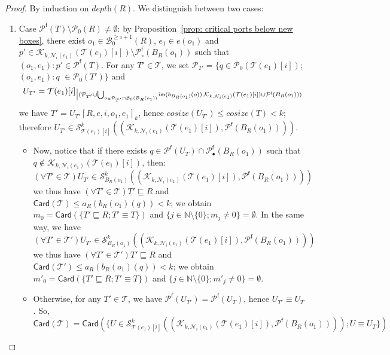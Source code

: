\documentclass{article}
\theoremstyle{plain}
\newcommand{\Nat}{\ensuremath{\mathbb{N}}}
\newcommand{\nontrivialconnected}[3]{\mathcal{S}_{#1}^{#3}(#2)}
\newcommand{\taylor}[2]{\mathcal{T}(#1)[#2]}
\newcommand{\criticalports}[3]{\mathcal{K}_{#2, #3}(#1)}
\newcommand{\cosize}[1]{\textit{cosize}(#1)}
\newcommand{\depthof}[1]{\textit{depth}(#1)}
\def\restriction#1#2{\mathchoice
              {\setbox1\hbox{${\displaystyle #1}_{\scriptstyle #2}$}
              \restrictionaux{#1}{#2}}
              {\setbox1\hbox{${\textstyle #1}_{\scriptstyle #2}$}
              \restrictionaux{#1}{#2}}
              {\setbox1\hbox{${\scriptstyle #1}_{\scriptscriptstyle #2}$}
              \restrictionaux{#1}{#2}}
              {\setbox1\hbox{${\scriptscriptstyle #1}_{\scriptscriptstyle #2}$}
              \restrictionaux{#1}{#2}}}
\def\restrictionaux#1#2{{#1\,\smash{\vrule height .8\ht1 depth .85\dp1}}_{\,#2}}
\newcommand{\im}[1]{\textsf{im}(#1)}
\newcommand{\portsatzero}[1]{\mathcal{P}_0(#1)}
\newcommand{\arity}[1]{{\textit{a}}_{#1}}
\newcommand{\conclusions}[1]{\mathcal{P}^{\textsf{f}}(#1)}
\newcommand{\Card}[1]{\textsf{Card}\left( #1 \right)}
\newcommand{\conclusionscirc}[1]{\mathcal{P}_\circ^{\textsf{f}}(#1)}
\newcommand{\conclusionsnotcirc}[1]{\mathcal{P}_\bullet^{\textsf{f}}(#1)}
\newcommand{\boxesatzero}[1]{\mathcal{B}_{0}(#1)}
\newcommand{\boxesatzerogeq}[2]{\mathcal{B}_0^{\geq #2}(#1)}
\begin{document}
\begin{proof}
By induction on $\depthof{R}$. We distinguish between two cases:
\begin{enumerate}
\item Case $\conclusions{T} \setminus \portsatzero{R} \not= \emptyset$: by Proposition~\ref{prop: critical ports below new boxes}, there exist $o_1 \in \boxesatzerogeq{R}{i+1}$, $e_1 \in e(o_1)$ and $p' \in \criticalports{\taylor{e_1}{i}}{k}{\mathcal{N}_i(e_1)} \setminus \conclusionscirc{B_R(o_1)}$ such that $(o_1, e_1):p' \in \conclusions{T}$. 
For any $T' \in \mathcal{T}$, we set $\mathcal{P}_{T'} = \{q \in \portsatzero{\taylor{e_1}{i}}; $ \mbox{$(o_1, e_1):q$} $\in \portsatzero{T'} \}$ and $$U_{T'} = \restriction{\taylor{e_1}{i}}{(\mathcal{P}_{T'} \cup \bigcup_{o \in \mathcal{P}_{T'} \cap \boxesatzero{B_R(o_1)}} \im{b_{B_R(o_1)}(o)}, \criticalports{\taylor{e_1}{i}}{k}{\mathcal{N}_i(e_1)} \cup \conclusions{B_R(o_1)})}$$ we have $T' = U_{T'}[R, e, i, o_1, e_1]_k$, hence $\cosize{U_{T'}} \leq \cosize{T} < k$; therefore $U_{T'} \in \nontrivialconnected{\taylor{e_1}{i}}{(\criticalports{\taylor{e_1}{i}}{k}{\mathcal{N}_i(e_1)}, \conclusions{B_R(o_1)})}{k}$. 
\begin{itemize}
\item Now, notice that if there exists $q \in \conclusions{U_T} \cap \conclusionsnotcirc{B_R(o_1)}$ such that $q \notin \criticalports{\taylor{e_1}{i}}{k}{\mathcal{N}_i(e_1)}$, then: 
$$(\forall T' \in \mathcal{T}) U_{T'} \in \nontrivialconnected{B_R(o_1)}{(\criticalports{\taylor{e_1}{i}}{k}{\mathcal{N}_i(e_1)}, \conclusions{B_R(o_1)})}{k}$$ we thus have $(\forall T' \in \mathcal{T}) T' \sqsubseteq R$ and $\Card{\mathcal{T}} \leq \arity{R}{(b_R(o_1)(q))} < k$; we obtain $m_0 = \Card{\{ T' \sqsubseteq R ; T' \equiv T \}}$ and $\{ j \in \Nat \setminus \{ 0 \} ; m_j \not= 0 \} = \emptyset$. In the same way, we have
$$(\forall T' \in \mathcal{T'}) U_{T'} \in \nontrivialconnected{B_R(o_1)}{(\criticalports{\taylor{e_1}{i}}{k}{\mathcal{N}_i(e_1)}, \conclusions{B_R(o_1)})}{k}$$ we thus have $(\forall T' \in \mathcal{T'}) T' \sqsubseteq R$ and $\Card{\mathcal{T'}} \leq \arity{R}{(b_R(o_1)(q))} < k$; we obtain $m'_0 = \Card{\{ T' \sqsubseteq R ; T' \equiv T \}}$ and $\{ j \in \Nat \setminus \{ 0 \} ; m'_j \not= 0 \} = \emptyset$.
\item Otherwise, for any $T' \in \mathcal{T}$, we have $\conclusions{U_{T'}} = \conclusions{U_T}$, hence $U_{T'} \equiv U_T$. So, 
$$\Card{\mathcal{T}} = \Card{\{ U \in \nontrivialconnected{\taylor{e_1}{i}}{(\criticalports{\taylor{e_1}{i}}{k}{\mathcal{N}_i(e_1)},  \conclusions{B_R(o_1)})}{k} ; U \equiv U_T \}}$$

\end{itemize}
\end{enumerate}
\end{proof}
\end{document}
